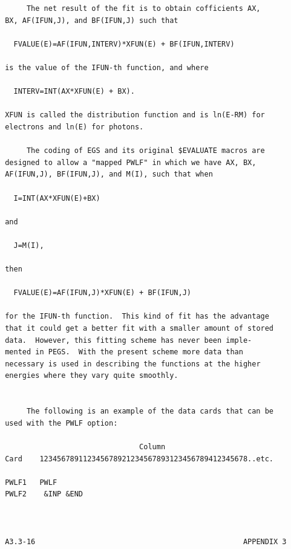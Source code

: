 \newpage {} \begin{verbatim}
      The net result of the fit is to obtain cofficients AX,
 BX, AF(IFUN,J), and BF(IFUN,J) such that

   FVALUE(E)=AF(IFUN,INTERV)*XFUN(E) + BF(IFUN,INTERV)

 is the value of the IFUN-th function, and where

   INTERV=INT(AX*XFUN(E) + BX).

 XFUN is called the distribution function and is ln(E-RM) for
 electrons and ln(E) for photons.

      The coding of EGS and its original $EVALUATE macros are
 designed to allow a "mapped PWLF" in which we have AX, BX,
 AF(IFUN,J), BF(IFUN,J), and M(I), such that when

   I=INT(AX*XFUN(E)+BX)

 and

   J=M(I),

 then

   FVALUE(E)=AF(IFUN,J)*XFUN(E) + BF(IFUN,J)

 for the IFUN-th function.  This kind of fit has the advantage
 that it could get a better fit with a smaller amount of stored
 data.  However, this fitting scheme has never been imple-
 mented in PEGS.  With the present scheme more data than
 necessary is used in describing the functions at the higher
 energies where they vary quite smoothly.


      The following is an example of the data cards that can be
 used with the PWLF option:

                                Column
 Card    123456789112345678921234567893123456789412345678..etc.

 PWLF1   PWLF
 PWLF2    &INP &END



 A3.3-16                                                APPENDIX 3
\end{verbatim}
